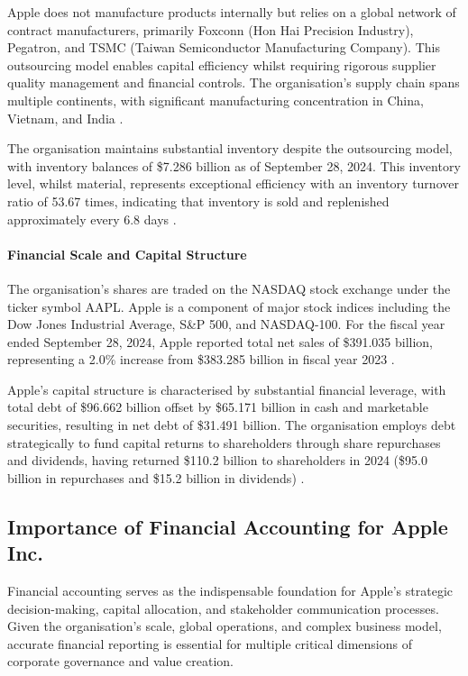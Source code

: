 \documentclass[12pt,a4paper]{article}
\begin{document}
Apple does not manufacture products internally but relies on a global network of contract manufacturers, primarily Foxconn (Hon Hai Precision Industry), Pegatron, and TSMC (Taiwan Semiconductor Manufacturing Company). This outsourcing model enables capital efficiency whilst requiring rigorous supplier quality management and financial controls. The organisation's supply chain spans multiple continents, with significant manufacturing concentration in China, Vietnam, and India \citep{apple202410k}.

The organisation maintains substantial inventory despite the outsourcing model, with inventory balances of \$7.286 billion as of September 28, 2024. This inventory level, whilst material, represents exceptional efficiency with an inventory turnover ratio of 53.67 times, indicating that inventory is sold and replenished approximately every 6.8 days \citep{apple202410k}.

\paragraph{Financial Scale and Capital Structure}

The organisation's shares are traded on the NASDAQ stock exchange under the ticker symbol AAPL. Apple is a component of major stock indices including the Dow Jones Industrial Average, S\&P 500, and NASDAQ-100. For the fiscal year ended September 28, 2024, Apple reported total net sales of \$391.035 billion, representing a 2.0\% increase from \$383.285 billion in fiscal year 2023 \citep{apple202410k}.

Apple's capital structure is characterised by substantial financial leverage, with total debt of \$96.662 billion offset by \$65.171 billion in cash and marketable securities, resulting in net debt of \$31.491 billion. The organisation employs debt strategically to fund capital returns to shareholders through share repurchases and dividends, having returned \$110.2 billion to shareholders in 2024 (\$95.0 billion in repurchases and \$15.2 billion in dividends) \citep{apple202410k}.

\subsection{Importance of Financial Accounting for Apple Inc.}

Financial accounting serves as the indispensable foundation for Apple's strategic decision-making, capital allocation, and stakeholder communication processes. Given the organisation's scale, global operations, and complex business model, accurate financial reporting is essential for multiple critical dimensions of corporate governance and value creation.
\end{document}
